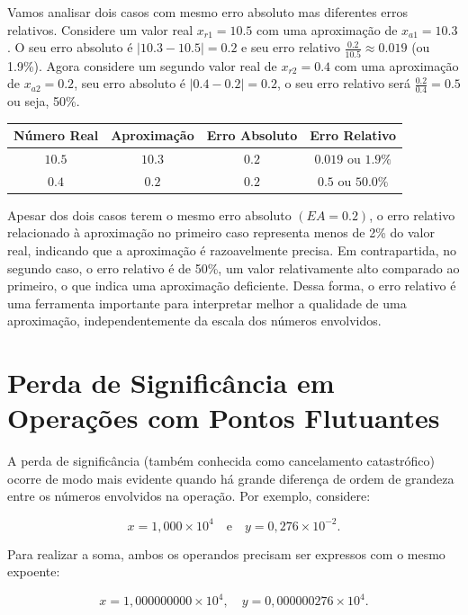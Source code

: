 Vamos analisar dois casos com mesmo erro absoluto mas diferentes erros
relativos. Considere um valor real \( x_{r1} = 10.5 \) com uma aproximação de
\( x_{a1} = 10.3 \). O seu erro absoluto é \(|10.3 - 10.5| = 0.2\) e seu erro
relativo \(\frac{0.2}{10.5} \approx 0.019\) (ou 1.9\%). Agora considere um
segundo valor real de \(x_{r2} = 0.4 \) com uma aproximação de \(x_{a2} = 0.2
\), seu erro absoluto é \(|0.4 - 0.2| = 0.2\), o seu erro relativo será
\(\frac{0.2}{0.4} = 0.5\) ou seja, 50\%.

\begin{center}
  \small
  \begin{tabular}{|c|c|c|c|}
    \hline
    \textbf{Número Real} & \textbf{Aproximação} & \textbf{Erro Absoluto} & \textbf{Erro Relativo}          \\
    \hline
    \(  10{.}5 \)        & \(  10{.}3 \)        & \(  0{.}2 \)           & \(  0{.}019 \) ou \( 1{.}9\% \) \\
    \hline
    \(  0{.}4 \)         & \(  0{.}2 \)         & \(  0{.}2 \)           & \(  0{.}5 \) ou \( 50{.}0\% \)  \\
    \hline
  \end{tabular}
\end{center}
Apesar dos dois casos terem o mesmo erro absoluto \( (EA=  0{.}2) \), o erro relativo relacionado à aproximação no primeiro caso representa menos de 2\% do valor real, indicando que a aproximação é razoavelmente precisa. Em contrapartida, no segundo caso, o erro relativo é de 50\%, um valor relativamente alto comparado ao primeiro, o que indica uma aproximação deficiente. Dessa forma, o erro relativo é uma ferramenta importante para interpretar melhor a qualidade de uma aproximação, independentemente da escala dos números envolvidos.

\section{Perda de Significância em Operações com Pontos Flutuantes}
A perda de significância (também conhecida como cancelamento catastrófico)
ocorre de modo mais evidente quando há grande diferença de ordem de grandeza
entre os números envolvidos na operação. Por exemplo, considere:

\[
  x = 1{,}000 \times 10^{4} \quad \text{e} \quad y = 0{,}276 \times 10^{-2}.
\]

Para realizar a soma, ambos os operandos precisam ser expressos com o mesmo
expoente:

\[
  x = 1{,}000000000 \times 10^4, \quad y = 0{,}000000276 \times 10^4.
\]


